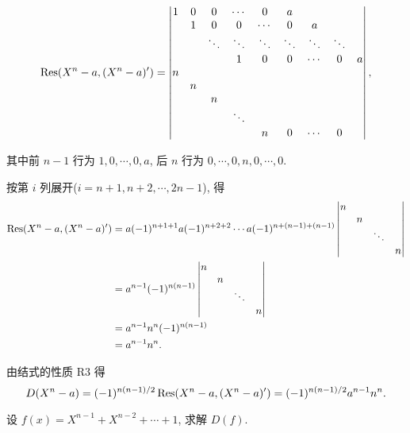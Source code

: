 \documentclass[color=black,device=normal,lang=cn,mode=geye]{elegantnote}
\begin{document}
\begin{solution}
    \[\operatorname{Res} (X^n-a,(X^n-a)')=\begin{vmatrix}
        1 & 0 & 0 & \cdots & 0 & a \\
        & 1 & 0 & 0 & \cdots & 0 & a \\
        && \ddots & \ddots & \ddots & \ddots & \ddots & \ddots \\
        &&& 1 & 0 & 0 & \cdots & 0 & a \\
        n \\
        & n \\
        && n \\
        &&& \ddots \\
        &&&& n & 0 & \cdots & 0 \\
    \end{vmatrix},\]

    其中前 $n-1$ 行为 $1,0,\cdots,0,a$, 后 $n$ 行为 $0,\cdots,0,n,0,\cdots,0$.

    按第 $i$ 列展开($i=n+1,n+2,\cdots,{2n-1}$), 得
    \begin{align*}
        \operatorname{Res} (X^n-a,(X^n-a)') & =a(-1)^{n+1+1}a(-1)^{n+2+2}\cdots a(-1)^{n+(n-1)+(n-1)}\begin{vmatrix}
            n \\
            & n \\
            && \ddots \\
            &&& n \\
        \end{vmatrix} \\
        & =a^{n-1}(-1)^{n(n-1)}\begin{vmatrix}
            n \\
            & n \\
            && \ddots \\
            &&& n \\
        \end{vmatrix} \\
        & =a^{n-1}n^n(-1)^{n(n-1)} \\
        & =a^{n-1}n^n.
    \end{align*}

    由结式的性质 R3 得
    \[D(X^n-a)=(-1)^{n(n-1)/2}\operatorname{Res} (X^n-a,(X^n-a)')=(-1)^{n(n-1)/2}a^{n-1}n^n.\]
\end{solution}
\begin{exercise}[2.9]
    设 $f(x)=X^{n-1}+X^{n-2}+\cdots+1$, 求解 $D(f)$.
\end{exercise}
\end{document}

